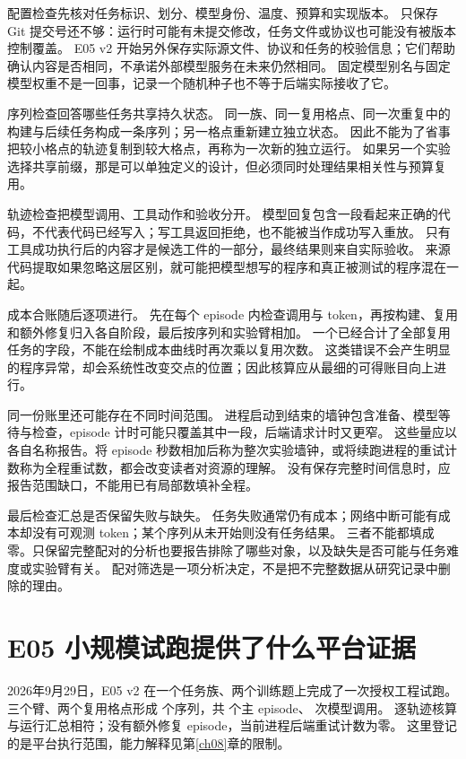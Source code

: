 配置检查先核对任务标识、划分、模型身份、温度、预算和实现版本。
只保存 Git 提交号还不够：运行时可能有未提交修改，任务文件或协议也可能没有被版本控制覆盖。
E05 v2 开始另外保存实际源文件、协议和任务的校验信息；它们帮助确认内容是否相同，不承诺外部模型服务在未来仍然相同。
固定模型别名与固定模型权重不是一回事，记录一个随机种子也不等于后端实际接收了它。

序列检查回答哪些任务共享持久状态。
同一族、同一复用格点、同一次重复中的构建与后续任务构成一条序列；另一格点重新建立独立状态。
因此不能为了省事把较小格点的轨迹复制到较大格点，再称为一次新的独立运行。
如果另一个实验选择共享前缀，那是可以单独定义的设计，但必须同时处理结果相关性与预算复用。

轨迹检查把模型调用、工具动作和验收分开。
模型回复包含一段看起来正确的代码，不代表代码已经写入；写工具返回拒绝，也不能被当作成功写入重放。
只有工具成功执行后的内容才是候选工件的一部分，最终结果则来自实际验收。
来源代码提取如果忽略这层区别，就可能把模型想写的程序和真正被测试的程序混在一起。

成本合账随后逐项进行。
先在每个 episode 内检查调用与 token，再按构建、复用和额外修复归入各自阶段，最后按序列和实验臂相加。
一个已经合计了全部复用任务的字段，不能在绘制成本曲线时再次乘以复用次数。
这类错误不会产生明显的程序异常，却会系统性改变交点的位置；因此核算应从最细的可得账目向上进行。

同一份账里还可能存在不同时间范围。
进程启动到结束的墙钟包含准备、模型等待与检查，episode 计时可能只覆盖其中一段，后端请求计时又更窄。
这些量应以各自名称报告。将 episode 秒数相加后称为整次实验墙钟，或将续跑进程的重试计数称为全程重试数，都会改变读者对资源的理解。
没有保存完整时间信息时，应报告范围缺口，不能用已有局部数填补全程。

最后检查汇总是否保留失败与缺失。
任务失败通常仍有成本；网络中断可能有成本却没有可观测 token；某个序列从未开始则没有任务结果。
三者不能都填成零。只保留完整配对的分析也要报告排除了哪些对象，以及缺失是否可能与任务难度或实验臂有关。
配对筛选是一项分析决定，不是把不完整数据从研究记录中删除的理由。

\section{E05 小规模试跑提供了什么平台证据}
\label{sec:appb-e05-smoke}

2026年9月29日，E05 v2 在一个任务族、两个训练题上完成了一次授权工程试跑。
三个臂、两个复用格点形成  个序列，共  个主 episode、 次模型调用。
逐轨迹核算与运行汇总相符；没有额外修复 episode，当前进程后端重试计数为零。
这里登记的是平台执行范围，能力解释见第\ref{ch08}章的限制。

